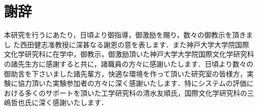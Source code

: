 \section*{謝辞}

本研究を行うにあたり，日頃より御指導，御激励を賜り，数々の御教示を頂きまし
た西田健志准教授に深甚なる謝恩の意を表します．また神戸大学大学院国際文化学研究科に在学中，御教示，御激励頂いた神戸大学大学院国際文化学研究科の諸先生方に感謝すると共に，諸職員の方々に感謝いたします．日頃より数々の御助言を下さいました諸先輩方，快適な環境を作って頂いた研究室の皆様方，実験に協力頂いた実験参加者の方々に深く感謝いたします．特にシステムの評価における多くのサポートを頂いた工学研究科の清水友順氏，国際文化学研究科の三嶋哲也氏に深く感謝いたします．